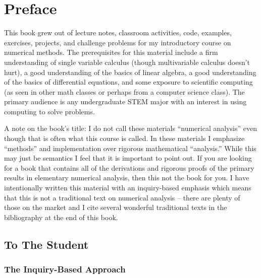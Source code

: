 \frontmatter
\chapter{Preface}
This book grew out of lecture notes, classroom activities, code, examples, exercises,
projects, and challenge problems for my introductory course on
numerical methods.  The prerequisites for this material include a firm understanding of
single variable calculus (though multivariable calculus doesn't hurt), a good
understanding of the basics of linear algebra, a good understanding of the basics of
differential equations, and some exposure to scientific computing (as seen in other math
classes or perhaps from a computer science class). The primary audience is any
undergraduate STEM major with an interest in using computing to solve problems.

A note on the book's title: I do not call these materials ``numerical
analysis'' even though that is often what this course is called.  In these materials I
emphasize ``methods'' and implementation over rigorous mathematical ``analysis.''  While
this may just be semantics I feel that it is important to point out.  If you are looking
for a book that contains all of the derivations and rigorous proofs of the primary results
in elementary numerical analysis, then this not the book for you.  I have
intentionally written this material with an inquiry-based emphasis which means that this
is not a traditional text on numerical analysis -- there are plenty of those on the market
and I cite several wonderful traditional texts in the bibliography at the end of this
book.

\section{To The Student}

\subsection{The Inquiry-Based Approach}

